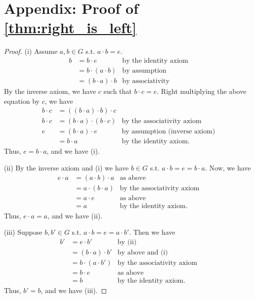 \documentclass[12pt]{article}
\begin{document}
\section{Appendix: Proof of \autoref{thm:right_is_left}}
\label{sec:proof_of_right_is_left}
\begin{proof}
    (i)
    Assume $a,b \in G$ s.t. $a \cdot b = e$.
    \begin{align*}
        b &= b\cdot e &\text{by the identity axiom} \\
          &= b \cdot (a \cdot b) &\text{by assumption}\\
          &= (b \cdot a) \cdot b &\text{by associativity}
    \end{align*}
    By the inverse axiom, we have $c$ such that $b \cdot c = e$.
    Right multiplying the above equation by $c$, we have
    \begin{align*}
        b \cdot c &= ((b \cdot a) \cdot b) \cdot c\\
        b \cdot c &= (b \cdot a) \cdot (b \cdot c) & \text{by the associativity axiom}\\
        e &= (b \cdot a) \cdot e & \text{by assumption (inverse axiom)}\\
          &= b \cdot a & \text{by the identity axiom}.
    \end{align*}
    Thus, $e = b\cdot a$, and we have (i).

    (ii)
    By the inverse axiom and (i) we have $b \in G$ s.t. $a \cdot b = e = b \cdot a$.
    Now, we have
    \begin{align*}
        e \cdot a &= (a \cdot b) \cdot a &\text{as above}\\
                  &= a \cdot (b \cdot a) &\text{by the associativity axiom}\\
                  &= a \cdot e &\text{as above}\\
                  &= a &\text{by the identity axiom}.
    \end{align*}
    Thus, $e \cdot a = a$, and we have (ii).

    (iii)
    Suppose $b,b' \in G$ s.t. $a\cdot b = e = a \cdot b'$. Then we have
    \begin{align*}
        b' &= e \cdot b' &\text{by (ii)}\\
           &= (b \cdot a) \cdot b' &\text{by above and (i)}\\
           &= b \cdot (a \cdot b') &\text{by the associativity axiom}\\
           &= b \cdot e &\text{as above}\\
           &= b &\text{by the identity axiom}.
    \end{align*}
    Thus, $b' = b$, and we have (iii).


\end{proof}
\end{document}

